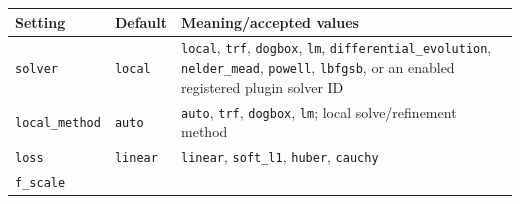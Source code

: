 \documentclass[
  10pt,
  a4paper,
  oneside]{scrreprt}
\begin{document}
\begin{longtable}[]{@{}lll@{}}
\toprule
\begin{minipage}[b]{0.30\columnwidth}\raggedright
Setting\strut
\end{minipage} & \begin{minipage}[b]{0.30\columnwidth}\raggedright
Default\strut
\end{minipage} & \begin{minipage}[b]{0.30\columnwidth}\raggedright
Meaning/accepted values\strut
\end{minipage}\tabularnewline
\midrule
\endhead
\begin{minipage}[t]{0.30\columnwidth}\raggedright
\texttt{solver}\strut
\end{minipage} & \begin{minipage}[t]{0.30\columnwidth}\raggedright
\texttt{local}\strut
\end{minipage} & \begin{minipage}[t]{0.30\columnwidth}\raggedright
\texttt{local}, \texttt{trf}, \texttt{dogbox}, \texttt{lm},
\texttt{differential\_evolution}, \texttt{nelder\_mead},
\texttt{powell}, \texttt{lbfgsb}, or an enabled registered plugin solver
ID\strut
\end{minipage}\tabularnewline
\begin{minipage}[t]{0.30\columnwidth}\raggedright
\texttt{local\_method}\strut
\end{minipage} & \begin{minipage}[t]{0.30\columnwidth}\raggedright
\texttt{auto}\strut
\end{minipage} & \begin{minipage}[t]{0.30\columnwidth}\raggedright
\texttt{auto}, \texttt{trf}, \texttt{dogbox}, \texttt{lm}; local
solve/refinement method\strut
\end{minipage}\tabularnewline
\begin{minipage}[t]{0.30\columnwidth}\raggedright
\texttt{loss}\strut
\end{minipage} & \begin{minipage}[t]{0.30\columnwidth}\raggedright
\texttt{linear}\strut
\end{minipage} & \begin{minipage}[t]{0.30\columnwidth}\raggedright
\texttt{linear}, \texttt{soft\_l1}, \texttt{huber},
\texttt{cauchy}\strut
\end{minipage}\tabularnewline
\begin{minipage}[t]{0.30\columnwidth}\raggedright
\texttt{f\_scale}\strut
\end{minipage} & \begin{minipage}[t]{0.30\columnwidth}\raggedright

\end{minipage}
\end{longtable}
\end{document}
